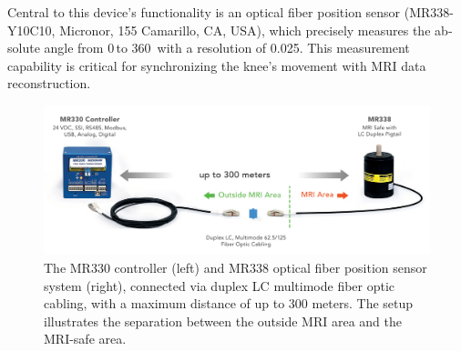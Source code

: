 \documentclass{micro-econ-thesis}
\begin{document}
Central to this device's functionality is an optical fiber position sensor (MR338-Y10C10, Micronor, 155 Camarillo, CA, USA), which precisely  measures the ab­solute angle from 0{\degree}\,to 360\degree \, with a resolution of 0.025\degree \parencite{rickenbach_optical_2013}. This measurement capability is critical for synchronizing the knee's movement with MRI data reconstruction. 
\begin{figure} [H]
	\centering
	\includegraphics[width=0.7\linewidth]{sensor_img}
	\caption{The MR330 controller (left) and MR338 optical fiber position sensor system (right), connected via duplex LC multimode fiber optic cabling, with a maximum distance of up to 300 meters. The setup illustrates the separation between the outside MRI area and the MRI-safe area.}
	\label{fig:sensorimg}
\end{figure}
\end{document}
